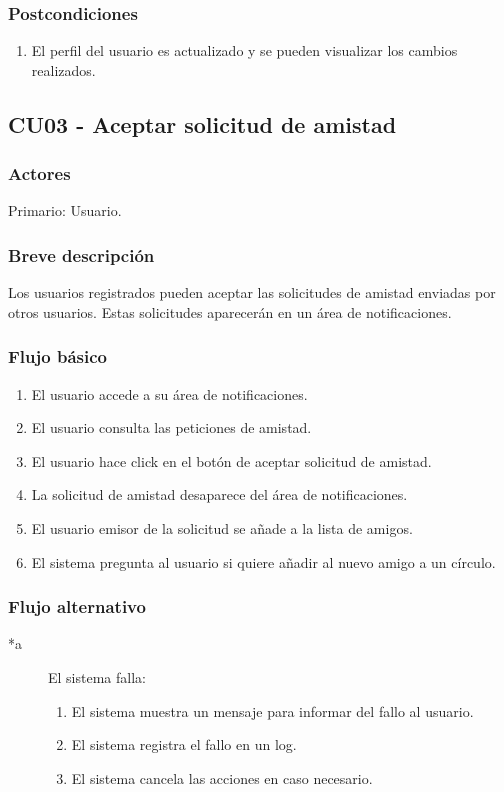 \documentclass[12pt, a4paper, titlepage]{article}
\begin{document}
\subsubsection{Postcondiciones}
	\begin{enumerate}
		\item El perfil del usuario es actualizado y se pueden visualizar los cambios realizados.
	\end{enumerate}



\subsection{CU03 - Aceptar solicitud de amistad}
\subsubsection{Actores}
Primario: Usuario.
\subsubsection{Breve descripción}
Los usuarios registrados pueden aceptar las solicitudes de amistad enviadas por otros usuarios. Estas solicitudes aparecerán en un área de notificaciones.
\subsubsection{Flujo básico}
\begin{enumerate}
	\item El usuario accede a su área de notificaciones.
	\item El usuario consulta las peticiones de amistad.
	\item El usuario hace click en el botón de aceptar solicitud de amistad.
	\item La solicitud de amistad desaparece del área de notificaciones.
	\item El usuario emisor de la solicitud se añade a la lista de amigos.
	\item El sistema pregunta al usuario si quiere añadir al nuevo amigo a un círculo.
\end{enumerate}
\subsubsection{Flujo alternativo}
\begin{description}
	\item [*a] El sistema falla:
	\begin{enumerate}
		\item El sistema muestra un mensaje para informar del fallo al usuario.
		\item El sistema registra el fallo en un log.
		\item El sistema cancela las acciones en caso necesario.
	\end{enumerate}
\end{description}
\end{document}
